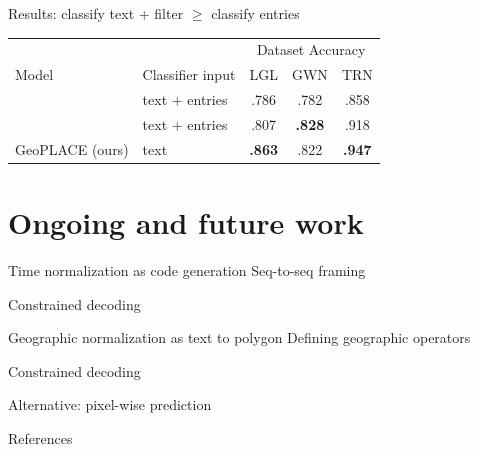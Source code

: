 \documentclass[14pt,aspectratio=169]{beamer}
\begin{document}
\begin{frame}{Results: classify text + filter $\geq$ classify entries}
\centering
\begin{tabular}{l l c c c}
\toprule
& & \multicolumn{3}{c}{Dataset Accuracy} \\
\cmidrule(lr){3-5}
Model & Classifier input & LGL & GWN & TRN \\
\midrule
\cite{ayoola-etal-2022-refined} & text + entries & .786 & .782 & .858 \\
\cite{zhang-bethard-2023-improving} & text + entries & .807 & \textbf{.828} & .918 \\
GeoPLACE (ours) & text & \textbf{.863} & .822 & \textbf{.947} \\
\bottomrule
\end{tabular}
\end{frame}


\section{Ongoing and future work}

\begin{frame}{Time normalization as code generation}
Seq-to-seq framing

Constrained decoding
\end{frame}


\begin{frame}{Geographic normalization as text to polygon}
Defining geographic operators

Constrained decoding

Alternative: pixel-wise prediction
\end{frame}


\appendix

\begin{frame}[allowframebreaks]{References}
\printbibliography
\end{frame}
\end{document}
